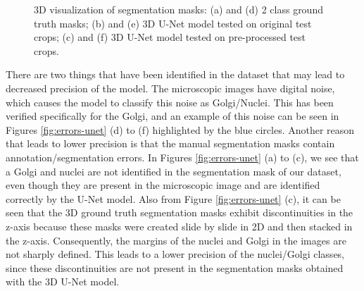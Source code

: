 \begin{figure}[!htb]
\hfil 
{}\hfil
{}
\caption{\ac{3D} visualization of segmentation masks: (a) and (d) 2 class ground truth masks; (b) and (e) \ac{3D} U-Net model tested on original test crops; (c) and (f) \ac{3D} U-Net model tested on pre-processed test crops.}

\label{fig:results-unet}

\end{figure}

There are two things that have been identified in the dataset that may lead to decreased precision of the model. The microscopic images have digital noise, which causes the model to classify this noise as Golgi/Nuclei. This has been verified specifically for the Golgi, and an example of this noise can be seen in Figures \ref{fig:errors-unet} (d) to (f) highlighted by the blue circles. Another reason that leads to lower precision is that the manual segmentation masks contain annotation/segmentation errors. In Figures \ref{fig:errors-unet} (a) to (c), we see that a Golgi and nuclei are not identified in the segmentation mask  of our dataset, even though they are present in the microscopic image and are identified correctly by the U-Net model. Also from Figure \ref{fig:errors-unet} (c), it can be seen that the \ac{3D} ground truth segmentation masks exhibit discontinuities in the z-axis because these masks were created slide by slide in \ac{2D} and then stacked in the z-axis. Consequently, the margins of the nuclei and Golgi in the images are not sharply defined. This leads to a lower precision of the nuclei/Golgi classes, since these discontinuities are not present in the segmentation masks obtained with the \ac{3D} U-Net model.

